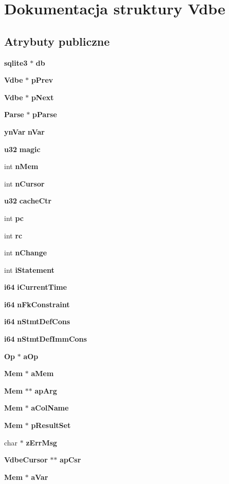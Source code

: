 \section{Dokumentacja struktury Vdbe}
\label{struct_vdbe}
\subsection*{Atrybuty publiczne}
\begin{DoxyCompactItemize}
\item 
\textbf{ sqlite3} $\ast$ \textbf{ db}
\item 
\textbf{ Vdbe} $\ast$ \textbf{ p\+Prev}
\item 
\textbf{ Vdbe} $\ast$ \textbf{ p\+Next}
\item 
\textbf{ Parse} $\ast$ \textbf{ p\+Parse}
\item 
\textbf{ yn\+Var} \textbf{ n\+Var}
\item 
\textbf{ u32} \textbf{ magic}
\item 
int \textbf{ n\+Mem}
\item 
int \textbf{ n\+Cursor}
\item 
\textbf{ u32} \textbf{ cache\+Ctr}
\item 
int \textbf{ pc}
\item 
int \textbf{ rc}
\item 
int \textbf{ n\+Change}
\item 
int \textbf{ i\+Statement}
\item 
\textbf{ i64} \textbf{ i\+Current\+Time}
\item 
\textbf{ i64} \textbf{ n\+Fk\+Constraint}
\item 
\textbf{ i64} \textbf{ n\+Stmt\+Def\+Cons}
\item 
\textbf{ i64} \textbf{ n\+Stmt\+Def\+Imm\+Cons}
\item 
\textbf{ Op} $\ast$ \textbf{ a\+Op}
\item 
\textbf{ Mem} $\ast$ \textbf{ a\+Mem}
\item 
\textbf{ Mem} $\ast$$\ast$ \textbf{ ap\+Arg}
\item 
\textbf{ Mem} $\ast$ \textbf{ a\+Col\+Name}
\item 
\textbf{ Mem} $\ast$ \textbf{ p\+Result\+Set}
\item 
char $\ast$ \textbf{ z\+Err\+Msg}
\item 
\textbf{ Vdbe\+Cursor} $\ast$$\ast$ \textbf{ ap\+Csr}
\item 
\textbf{ Mem} $\ast$ \textbf{ a\+Var}
\item 

\end{DoxyCompactItemize}
